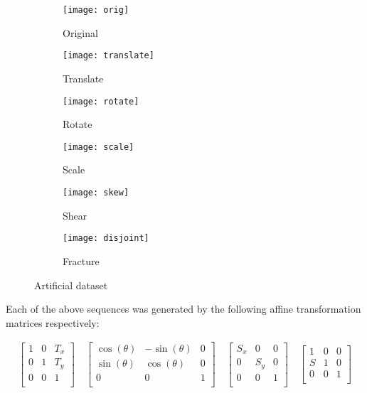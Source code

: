 \begin{figure}[h]
  \centering
  \begin{subfigure}[b]{.16\textwidth}
    \texttt{[image: orig]}
    \caption{Original}
    \label{fig:orig}
  \end{subfigure}
  \begin{subfigure}[b]{.16\textwidth}
    \texttt{[image: translate]}
    \caption{Translate}
    \label{fig:trans}
  \end{subfigure}
  \begin{subfigure}[b]{.16\textwidth}
    \texttt{[image: rotate]}
    \caption{Rotate}
    \label{fig:rot}
  \end{subfigure}
  \begin{subfigure}[b]{.16\textwidth}
    \texttt{[image: scale]}
    \caption{Scale}
    \label{fig:scale}
  \end{subfigure}
  \begin{subfigure}[b]{.16\textwidth}
    \texttt{[image: skew]}
    \caption{Shear}
    \label{fig:skew}
  \end{subfigure}
  \begin{subfigure}[b]{.16\textwidth}
    \texttt{[image: disjoint]}
    \caption{Fracture}
    \label{fig:disj}
  \end{subfigure}
  \caption{Artificial dataset}
  \label{fig:artificial}
\end{figure}

Each of the above sequences was generated by the following affine transformation matrices respectively:

\begin{align*}
  \begin{bmatrix}
  1 & 0 & T_x \\
  0 & 1 & T_y \\
  0 & 0 & 1 \\
  \end{bmatrix}
  \hspace{1em}
  \begin{bmatrix}
  \cos(\theta) & -\sin(\theta) & 0 \\
  \sin(\theta) & \cos(\theta) & 0 \\
  0 & 0 & 1 \\
  \end{bmatrix}
  \hspace{1em}
  \begin{bmatrix}
  S_x & 0 & 0 \\
  0 & S_y & 0 \\
  0 & 0 & 1 \\
  \end{bmatrix}
  \hspace{1em}
  \begin{bmatrix}
  1 & 0 & 0 \\
  S & 1 & 0 \\
  0 & 0 & 1 \\
  \end{bmatrix}
\end{align*}

